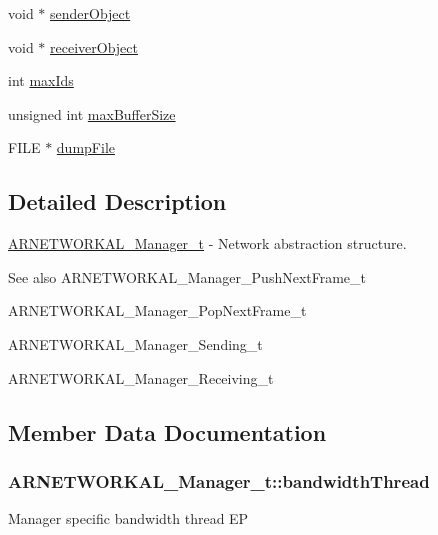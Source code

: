 \begin{DoxyCompactItemize}
\item 
void $\ast$ \hyperlink{struct_a_r_n_e_t_w_o_r_k_a_l___manager__t_accde823071e26498833b76fdc01de0f0}{sender\+Object}
\item 
void $\ast$ \hyperlink{struct_a_r_n_e_t_w_o_r_k_a_l___manager__t_a77963799a066c8441ee7f7cc31976da8}{receiver\+Object}
\item 
int \hyperlink{struct_a_r_n_e_t_w_o_r_k_a_l___manager__t_a9401ee06c0c3afea5ec089e64ef37ede}{max\+Ids}
\item 
unsigned int \hyperlink{struct_a_r_n_e_t_w_o_r_k_a_l___manager__t_ad4b8498564736c74c3dfc47ca1286905}{max\+Buffer\+Size}
\item 
F\+I\+LE $\ast$ \hyperlink{struct_a_r_n_e_t_w_o_r_k_a_l___manager__t_a6fe8509f510221c8cda5b9bd3ba2f858}{dump\+File}
\end{DoxyCompactItemize}


\subsection{Detailed Description}
\hyperlink{struct_a_r_n_e_t_w_o_r_k_a_l___manager__t}{A\+R\+N\+E\+T\+W\+O\+R\+K\+A\+L\+\_\+\+Manager\+\_\+t} -\/ Network abstraction structure. 

\begin{DoxySeeAlso}{See also}
A\+R\+N\+E\+T\+W\+O\+R\+K\+A\+L\+\_\+\+Manager\+\_\+\+Push\+Next\+Frame\+\_\+t 

A\+R\+N\+E\+T\+W\+O\+R\+K\+A\+L\+\_\+\+Manager\+\_\+\+Pop\+Next\+Frame\+\_\+t 

A\+R\+N\+E\+T\+W\+O\+R\+K\+A\+L\+\_\+\+Manager\+\_\+\+Sending\+\_\+t 

A\+R\+N\+E\+T\+W\+O\+R\+K\+A\+L\+\_\+\+Manager\+\_\+\+Receiving\+\_\+t 
\end{DoxySeeAlso}


\subsection{Member Data Documentation}
\subsubsection[{\texorpdfstring{bandwidth\+Thread}{bandwidthThread}}]{ A\+R\+N\+E\+T\+W\+O\+R\+K\+A\+L\+\_\+\+Manager\+\_\+t\+::bandwidth\+Thread}\hypertarget{struct_a_r_n_e_t_w_o_r_k_a_l___manager__t_a9224cc47701447b2c76f19665de8df75}{}\label{struct_a_r_n_e_t_w_o_r_k_a_l___manager__t_a9224cc47701447b2c76f19665de8df75}
Manager specific bandwidth thread EP 
